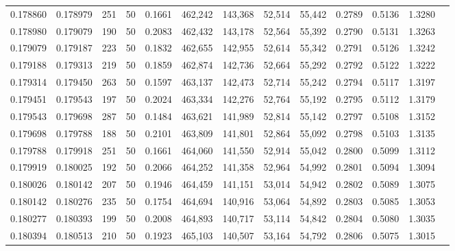 \begin{tabular}{rrrrrrrrrrrrr}
0.178860 & 0.178979 &   251 &  50 &                                     0.1661 & 462,242 & 143,368 &  52,514 &  55,442 & 0.2789 & 0.5136 & 1.3280 \\
0.178980 & 0.179079 &   190 &  50 &                                     0.2083 & 462,432 & 143,178 &  52,564 &  55,392 & 0.2790 & 0.5131 & 1.3263 \\
0.179079 & 0.179187 &   223 &  50 &                                     0.1832 & 462,655 & 142,955 &  52,614 &  55,342 & 0.2791 & 0.5126 & 1.3242 \\
0.179188 & 0.179313 &   219 &  50 &                                     0.1859 & 462,874 & 142,736 &  52,664 &  55,292 & 0.2792 & 0.5122 & 1.3222 \\
0.179314 & 0.179450 &   263 &  50 &                                     0.1597 & 463,137 & 142,473 &  52,714 &  55,242 & 0.2794 & 0.5117 & 1.3197 \\
0.179451 & 0.179543 &   197 &  50 &                                     0.2024 & 463,334 & 142,276 &  52,764 &  55,192 & 0.2795 & 0.5112 & 1.3179 \\
0.179543 & 0.179698 &   287 &  50 &                                     0.1484 & 463,621 & 141,989 &  52,814 &  55,142 & 0.2797 & 0.5108 & 1.3152 \\
0.179698 & 0.179788 &   188 &  50 &                                     0.2101 & 463,809 & 141,801 &  52,864 &  55,092 & 0.2798 & 0.5103 & 1.3135 \\
0.179788 & 0.179918 &   251 &  50 &                                     0.1661 & 464,060 & 141,550 &  52,914 &  55,042 & 0.2800 & 0.5099 & 1.3112 \\
0.179919 & 0.180025 &   192 &  50 &                                     0.2066 & 464,252 & 141,358 &  52,964 &  54,992 & 0.2801 & 0.5094 & 1.3094 \\
0.180026 & 0.180142 &   207 &  50 &                                     0.1946 & 464,459 & 141,151 &  53,014 &  54,942 & 0.2802 & 0.5089 & 1.3075 \\
0.180142 & 0.180276 &   235 &  50 &                                     0.1754 & 464,694 & 140,916 &  53,064 &  54,892 & 0.2803 & 0.5085 & 1.3053 \\
0.180277 & 0.180393 &   199 &  50 &                                     0.2008 & 464,893 & 140,717 &  53,114 &  54,842 & 0.2804 & 0.5080 & 1.3035 \\
0.180394 & 0.180513 &   210 &  50 &                                     0.1923 & 465,103 & 140,507 &  53,164 &  54,792 & 0.2806 & 0.5075 & 1.3015 \\

\end{tabular}
